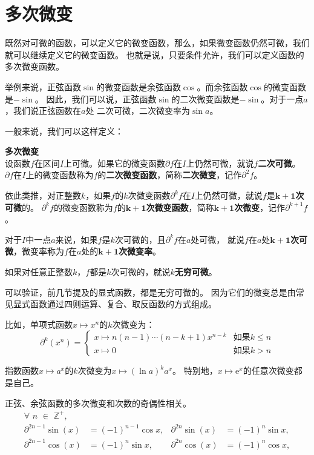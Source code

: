 \documentclass[12pt,UTF8]{ctexbook}
\begin{document}
\section{多次微变}
既然对可微的函数，可以定义它的微变函数，那么，如果微变函数仍然可微，我们就可以继续定义它的微变函数。
也就是说，只要条件允许，我们可以定义函数的多次微变函数。

举例来说，正弦函数$\sin$的微变函数是余弦函数$\cos$。而余弦函数$\cos$的微变函数是$-\sin$。
因此，我们可以说，正弦函数$\sin$的二次微变函数是$-\sin$。对于一点$a$，我们说正弦函数在$a$处
二次可微，二次微变率为$\sin{a}$。

一般来说，我们可以这样定义：
\begin{df}{\textbf{多次微变}}
    \mbox{} \\
    设函数$f$在区间$I$上可微。如果它的微变函数$\partial f$在$I$上仍然可微，就说$f$\textbf{二次可微}。
    $\partial f$在$I$上的微变函数称为$f$的\textbf{二次微变函数}，简称\textbf{二次微变}，记作$\partial^2 f$。
    
    依此类推，对正整数$k$，如果$f$的$k$次微变函数$\partial^k f$在$I$上仍然可微，就说$f$是$\boldsymbol{k+1}$\textbf{次可微}的。
    $\partial^k f$的微变函数称为$f$的$\boldsymbol{k+1}$\textbf{次微变函数}，简称$\boldsymbol{k+1}$\textbf{次微变}，记作$\partial^{k+1} f$。

    对于$I$中一点$a$来说，如果$f$是$k$次可微的，且$\partial^k f$在$a$处可微，
    就说$f$在$a$处$\boldsymbol{k+1}$\textbf{次可微}，微变率称为$f$在$a$处的$\boldsymbol{k+1}$\textbf{次微变率}。

    如果对任意正整数$k$，$f$都是$k$次可微的，就说$k$\textbf{无穷可微}。
\end{df}

可以验证，前几节提及的显式函数，都是无穷可微的。
因为它们的微变总是由常见显式函数通过四则运算、复合、取反函数的方式组成。

比如，单项式函数$x\mapsto x^n$的$k$次微变为：
$$ \partial^k (x^n) = \left\{
    \begin{array}{ll}
        x\mapsto n(n-1)\cdots(n-k+1) x^{n-k} & \mbox{如果} k \leqslant n \\
        x\mapsto 0 & \mbox{如果} k > n
    \end{array}\right.
$$

指数函数$x\mapsto a^x$的$k$次微变为$x\mapsto (\ln{a})^k a^x$。
特别地，$x\mapsto \mathrm{e}^x$的任意次微变都是自己。

正弦、余弦函数的多次微变和次数的奇偶性相关。
\begin{align*}
    \forall \,\,n\,\,\in\,\,\mathbb{Z}^+, \\
    \partial^{2n-1} \sin(x) &= (-1)^{n-1} \cos{x}, & \partial^{2n} \sin(x) &= (-1)^{n} \sin{x},  \\
    \partial^{2n-1} \cos(x) &= (-1)^{n} \sin{x}, & \partial^{2n} \cos(x) &= (-1)^{n} \cos{x},  
\end{align*}
\end{document}
